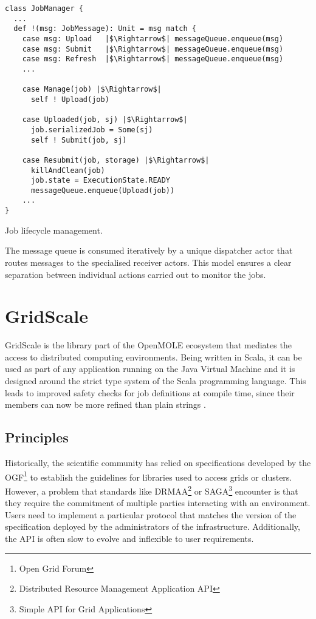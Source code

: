 \begin{listing}[H]
	\centering
	\begin{minipage}{8.9cm}
		\begin{verbatim}
class JobManager {
  ...
  def !(msg: JobMessage): Unit = msg match {
    case msg: Upload   |$\Rightarrow$| messageQueue.enqueue(msg)
    case msg: Submit   |$\Rightarrow$| messageQueue.enqueue(msg)
    case msg: Refresh  |$\Rightarrow$| messageQueue.enqueue(msg)
    ...

    case Manage(job) |$\Rightarrow$|
      self ! Upload(job)
      
    case Uploaded(job, sj) |$\Rightarrow$|
      job.serializedJob = Some(sj)
      self ! Submit(job, sj)
      
    case Resubmit(job, storage) |$\Rightarrow$|
      killAndClean(job)
      job.state = ExecutionState.READY
      messageQueue.enqueue(Upload(job))      
    ...
}
		\end{verbatim}
	\end{minipage}
	\caption{Job lifecycle management.}
	\label{JobManager}
\end{listing}

The message queue is consumed iteratively by a unique dispatcher actor that routes messages to the specialised receiver actors. This model ensures a clear separation between individual actions carried out to monitor the jobs.

\section{GridScale} \label{GridScaleSection}

GridScale is the library part of the OpenMOLE ecosystem that mediates the access to distributed computing environments. Being written in Scala, it can be used as part of any application running on the Java Virtual Machine and it is designed around the strict type system of the Scala programming language. This leads to improved safety checks for job definitions at compile time, since their members can now be more refined than plain strings \cite{Reuillon2016}.

\subsection{Principles}

Historically, the scientific community has relied on specifications developed by the OGF\footnote{Open Grid Forum} \cite{OGF} to establish the guidelines for libraries used to access grids or clusters. However, a problem that standards like DRMAA\footnote{Distributed Resource Management Application API} \cite{DRMAA} or SAGA\footnote{Simple API for Grid Applications} \cite{SAGA} encounter is that they require the commitment of multiple parties interacting with an environment. Users need to implement a particular protocol that matches the version of the specification deployed by the administrators of the infrastructure. Additionally, the API is often slow to evolve and inflexible to user requirements.


